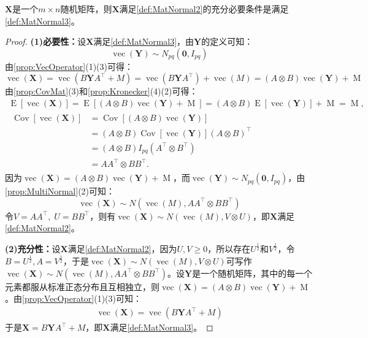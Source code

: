 \begin{theorem}
	$\mathbf{X}$是一个$m\times n$随机矩阵，则$\mathbf{X}$满足\cref{def:MatNormal2}的充分必要条件是满足\cref{def:MatNormal3}。
\end{theorem}
\begin{proof}
	\textbf{(1)必要性：}设$\mathbf{X}$满足\cref{def:MatNormal3}，由$\mathbf{Y}$的定义可知：
	\begin{equation*}
		\operatorname{vec}(\mathbf{Y})\sim N_{pq}(\mathbf{0},I_{pq})
	\end{equation*}
	由\cref{prop:VecOperator}(1)(3)可得：
	\begin{equation*}
		\operatorname{vec}(\mathbf{X})=\operatorname{vec}(B\mathbf{Y}A^{\top}+M)=\operatorname{vec}(B\mathbf{Y}A^{\top})+\operatorname{vec}(M)=(A\otimes B)\operatorname{vec}(\mathbf{Y})+\operatorname{M}
	\end{equation*}
	由\cref{prop:CovMat}(3)和\cref{prop:Kronecker}(4)(2)可得：
	\begin{gather*}
		\operatorname{E}[\operatorname{vec}(\mathbf{X})] 
		= \operatorname{E}[(A \otimes B)\operatorname{vec}(\mathbf{Y}) + \operatorname{M}] 
		= (A \otimes B)\operatorname{E}[\operatorname{vec}(\mathbf{Y})] + \operatorname{M} 
		= \operatorname{M}, \\[1ex]
		\begin{aligned}
			\operatorname{Cov}[\operatorname{vec}(\mathbf{X})] 
			&= \operatorname{Cov}[(A \otimes B)\operatorname{vec}(\mathbf{Y})] \\
			&= (A \otimes B)\operatorname{Cov}[\operatorname{vec}(\mathbf{Y})](A \otimes B)^{\top} \\
			&= (A \otimes B)I_{pq}(A^{\top} \otimes B^{\top}) \\
			&= AA^{\top} \otimes BB^{\top}.
		\end{aligned}
	\end{gather*}
	因为$\operatorname{vec}(\mathbf{X})=(A\otimes B)\operatorname{vec}(\mathbf{Y})+\operatorname{M}$，而$\operatorname{vec}(\mathbf{Y})\sim N_{pq}(\mathbf{0},I_{pq})$，由\cref{prop:MultiNormal}(2)可知：
	\begin{equation*}
		\operatorname{vec}(\mathbf{X})\sim N(\operatorname{vec}(M),AA^{\top}\otimes BB^{\top})
	\end{equation*}
	令$V=AA^{\top},\;U=BB^{\top}$，则有$\operatorname{vec}(\mathbf{X})\sim N(\operatorname{vec}(M),V\otimes U)$，即$\mathbf{X}$满足\cref{def:MatNormal2}。\par
	\textbf{(2)充分性：}设$\mathbf{X}$满足\cref{def:MatNormal2}，因为$U,V\geqslant0$，所以存在$U^{\frac{1}{2}}$和$V^{\frac{1}{2}}$，令$B=U^{\frac{1}{2}},A=V^{\frac{1}{2}}$，于是$\operatorname{vec}(\mathbf{X})\sim N(\operatorname{vec}(M),V\otimes U)$可写作$\operatorname{vec}(\mathbf{X})\sim N(\operatorname{vec}(M),AA^{\top}\otimes BB^{\top})$。设$\mathbf{Y}$是一个随机矩阵，其中的每一个元素都服从标准正态分布且互相独立，则$\operatorname{vec}(\mathbf{X})=(A\otimes B)\operatorname{vec}(\mathbf{Y})+\operatorname{M}$。由\cref{prop:VecOperator}(1)(3)可知：
	\begin{gather*}
		\operatorname{vec}(\mathbf{X})=\operatorname{vec}(B\mathbf{Y}A^{\top}+M)
	\end{gather*}
	于是$\mathbf{X}=B\mathbf{Y}A^{\top}+M$，即$\mathbf{X}$满足\cref{def:MatNormal3}。
\end{proof}
